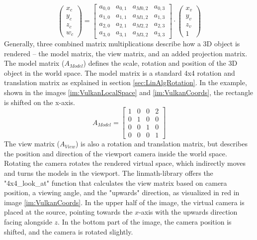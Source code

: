 \begin{equation*}
    \begin{pmatrix}
        x_{c} \\
        y_{c} \\
        z_{c} \\
        w_{c}
    \end{pmatrix}
    =
    \begin{bmatrix}
        a_{0,0} & a_{0,1} & a_{M 0,2} & a_{0,3} \\
        a_{1,0} & a_{1,1} & a_{M 1,2} & a_{1,3} \\
        a_{2,0} & a_{2,1} & a_{M 2,2} & a_{2,3} \\
        a_{3,0} & a_{3,1} & a_{M 3,2} & a_{3,3}
    \end{bmatrix}
    \cdot
    \begin{pmatrix}
        x_{v} \\
        y_{v} \\
        z_{v} \\
        1
    \end{pmatrix}
\end{equation*}
Generally, three combined matrix multiplications describe how a 3D object is rendered – the model matrix, the view matrix, and an added projection matrix. The model matrix ($A_{Model}$) defines the scale, rotation and position of the 3D object in the world space. The model matrix is a standard 4x4 rotation and translation matrix as explained in section \ref{sec:LinAlgRotation}. In the example, shown in the images \ref{im:VulkanLocalSpace} and \ref{im:VulkanCoords}, the rectangle is shifted on the x-axis.\\
\begin{equation*}
    A_{Model} =
\begin{bmatrix}
    1 & 0 & 0 & 2 \\
    0 & 1 & 0 & 0 \\
    0 & 0 & 1 & 0 \\
    0 & 0 & 0 & 1
\end{bmatrix}
\end{equation*}
The view matrix ($A_{View}$) is also a rotation and translation matrix, but describes the position and direction of the viewport camera inside the world space. Rotating the camera rotates the rendered virtual space, which indirectly moves and turns the models in the viewport. The linmath-library offers the "4x4\_look\_at" function that calculates the view matrix based on camera position, a viewing angle, and the "upwards" direction, as visualized in red in image \ref{im:VulkanCoords}. In the upper half of the image, the virtual camera is placed at the source, pointing towards the $x$-axis with the upwards direction facing alongside $z$. In the bottom part of the image, the camera position is shifted, and the camera is rotated slightly.
